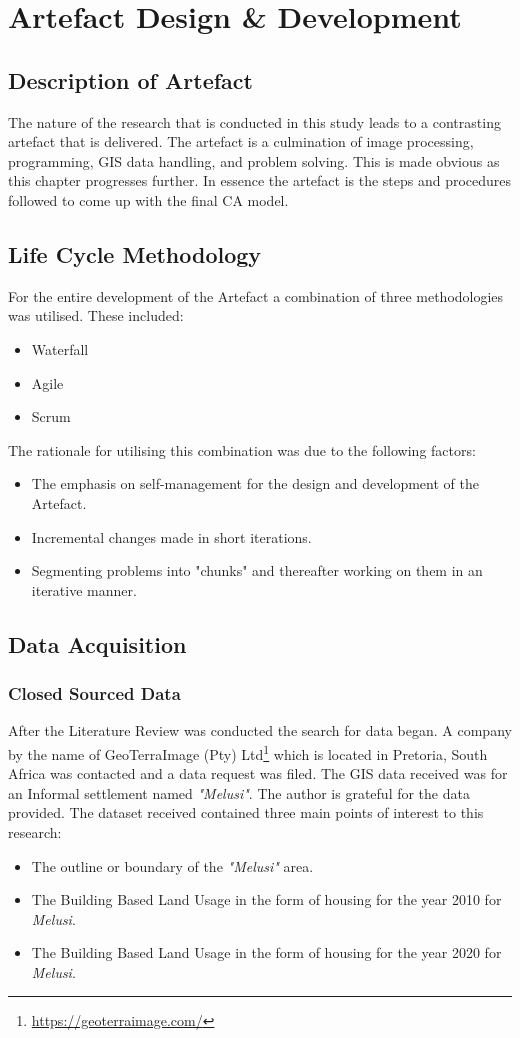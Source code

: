 
\chapter{Artefact Design \& Development} %
\label{Chapter3} %
\section{Description of Artefact}
The nature of the research that is conducted in this study leads to a contrasting artefact that is delivered. The artefact is a culmination of image processing, programming, GIS data handling, and problem solving. This is made obvious as this chapter progresses further. In essence the artefact is the steps and procedures followed to come up with the final CA model.
\section{Life Cycle Methodology}
For the entire development of the Artefact a combination of three methodologies was utilised. These included:
\begin{itemize}
\item Waterfall
\item Agile
\item Scrum
\end{itemize}
The rationale for utilising this combination was due to the following factors:
\begin{itemize}
\item The emphasis on self-management for the design and development of the Artefact.
\item Incremental changes made in short iterations.
\item Segmenting problems into "chunks" and thereafter working on them in an iterative manner.
\end{itemize}
\section{Data Acquisition}
\subsection{Closed Sourced Data}
After the Literature Review was conducted the search for data began. A company by the name of GeoTerraImage (Pty) Ltd\footnote{\url{https://geoterraimage.com/}} which is located in Pretoria, South Africa was contacted and a data request was filed. The GIS data received was for an Informal settlement named \textit{"Melusi"}. The author is grateful for the data provided. The dataset received contained three main points of interest to this research:
\begin{itemize}
\item The outline or boundary of the \textit{"Melusi"} area.
\item The Building Based Land Usage in the form of housing for the year 2010 for \textit{Melusi}.
\item The Building Based Land Usage in the form of housing for the year 2020 for \textit{Melusi}.
\end{itemize}
